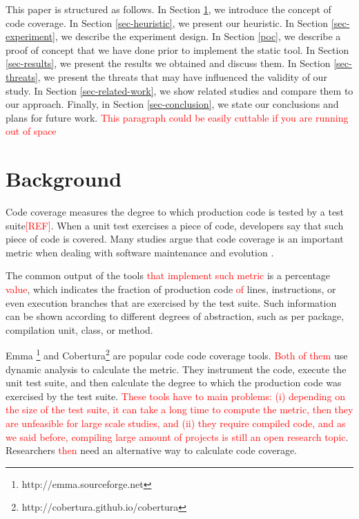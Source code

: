 \documentclass{sig-alternate}
\begin{document}
This paper is structured as follows. In Section \ref{sec-code-coverage}, 
we introduce the concept of code coverage. In Section \ref{sec-heuristic}, 
we present our heuristic. In Section \ref{sec-experiment}, we describe the 
experiment design. In Section \ref{poc}, we describe a proof of concept that
we have done prior to implement the static tool. 
In Section \ref{sec-results}, we present the results we 
obtained and discuss them. In Section \ref{sec-threats}, 
we present the threats that may have influenced the validity of our study. 
In Section \ref{sec-related-work}, we show related studies and compare them 
to our approach. Finally, in Section \ref{sec-conclusion}, we state our 
conclusions and plans for future work. \textcolor{red}{This paragraph could be easily cuttable if you are running out of space}


\section{ Background}
\label{sec-code-coverage}

Code coverage measures the degree to which production code is tested by a test suite\textcolor{red}{[REF]}. 
When a unit test exercises a piece of code, developers say that such piece
of code is covered. Many studies argue that code coverage is an important
metric when dealing with software maintenance and evolution \cite{sebastian, del-frate, mei-hwa}.

The common output of the tools \textcolor{red}{that implement such metric} is a percentage \textcolor{red}{value}, which indicates the fraction of production code \textcolor{red}{of} lines, instructions, 
or even execution branches that are exercised by the test suite. Such information can be shown according to different
degrees of abstraction, such as per package,  compilation unit,  class, or  method. 

Emma \footnote{http://emma.sourceforge.net} and Cobertura\footnote{http://cobertura.github.io/cobertura} are popular 
code code coverage tools.  \textcolor{red}{Both of them} use dynamic analysis to calculate the metric. They instrument the code, execute 
the unit test suite, and then calculate the degree to which the production code was exercised by the test suite. \textcolor{red}{These tools have to main problems: (i) depending on the size of the test suite, it can take a long time to compute the metric, then they are unfeasible for large scale studies, and (ii) they require compiled code, and as we said before, compiling large amount of projects is still an open research topic}.  Researchers \textcolor{red}{then} need an alternative way to calculate code coverage.
\end{document}
